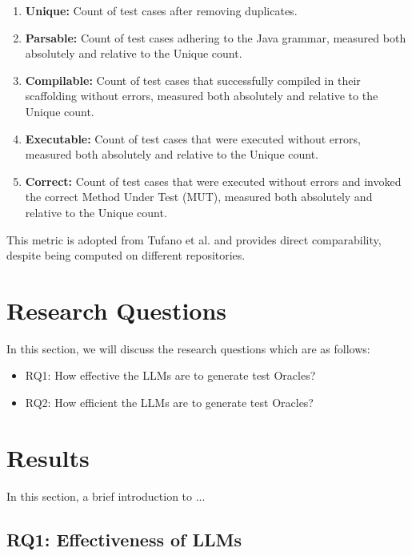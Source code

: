     \begin{enumerate}
        \item \textbf{Unique:} Count of test cases after removing duplicates.
        \item \textbf{Parsable:} Count of test cases adhering to the Java grammar, measured both absolutely and relative to the Unique count.
        \item \textbf{Compilable:} Count of test cases that successfully compiled in their scaffolding without errors, measured both absolutely and relative to the Unique count.
        \item \textbf{Executable:} Count of test cases that were executed without errors, measured both absolutely and relative to the Unique count.
        \item \textbf{Correct:} Count of test cases that were executed without errors and invoked the correct Method Under Test (MUT), measured both absolutely and relative to the Unique count. 
    \end{enumerate}
    This metric is adopted from Tufano et al. \cite{tufano_unit_2021} and provides direct comparability, despite being computed on different repositories.

\section{Research Questions}
\label{sec:research_questions}
\vspace{0.2 cm}

In this section, we will discuss the research questions which are as follows:
\begin{itemize}
  \item RQ1: How effective the LLMs are to generate test Oracles?
  \item RQ2: How efficient the LLMs are to generate test Oracles?
\end{itemize}

\section{Results}
\label{sec:results}
\vspace{0.2 cm}

In this section, a brief introduction to ... 

\vspace{0.1 cm}
\subsection{RQ1: Effectiveness of LLMs}
\label{sec:results_rq1}
\vspace{0.1 cm}

